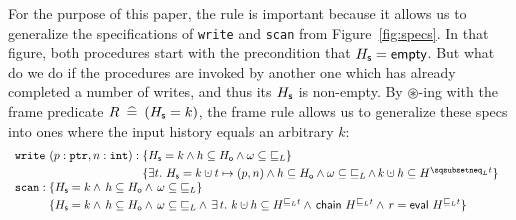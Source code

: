 For the purpose of this paper, the rule is important because it allows
us to generalize the specifications of {\tt write} and {\tt scan} from
Figure~\ref{fig:specs}. In that figure, both procedures start with the
precondition that $H_{\mathsf{s}} = \mathsf{empty}$. But what do we do if the
procedures are invoked by another one which has already completed a
number of writes, and thus its $H_{\mathsf{s}}$ is non-empty. By
$\circledast$-ing with the frame predicate $R \mathrel{\:\widehat{=}\:} (H_{\mathsf{s}} = k)$,
the frame rule allows us to generalize these specs into ones where the
input history equals an arbitrary $k$:
\[
\begin{array}{l}
\mathtt{write}\ (p : \mathtt{ptr}, n : \mathtt{int}) : 
\!\!\!\begin{array}[t]{l}
\{\histS = k \wedge h \subseteq \histO
           \wedge \omega \subseteq {\jleq}\}\\[3pt]
\{\exists t\ldot\, \histS = k \hunion t \mapsto (p, n) \wedge h \subseteq \histO \wedge
  \omega \subseteq {\jleq}\,{\wedge}\, k \hunion h \subseteq H^{\hbox{}\sqsubsetneq_\ordlist t}\}
\end{array}\\
%
\mathtt{scan} : 
\!\!\!\begin{array}[t]{l}
\{\histS = k \wedge\, h \subseteq \histO \wedge\,
          \omega \subseteq {\jleq}\}\\[3pt]
          \{\histS = k \wedge\, h \subseteq \histO \wedge\,
            \omega \subseteq {\jleq} \wedge\, \exists\, t\ldot\, %
             k \hunion h \subseteq H^{\hbox{}\sqsubseteq_\ordlist t} \wedge\,
             \mathsf{chain}\ H^{\hbox{}\sqsubseteq_\ordlist t} \wedge\,
             r = \mathsf{eval}\ {H^{\hbox{}\sqsubseteq_\ordlist t}}\}
       \end{array}
\end{array}
\]



